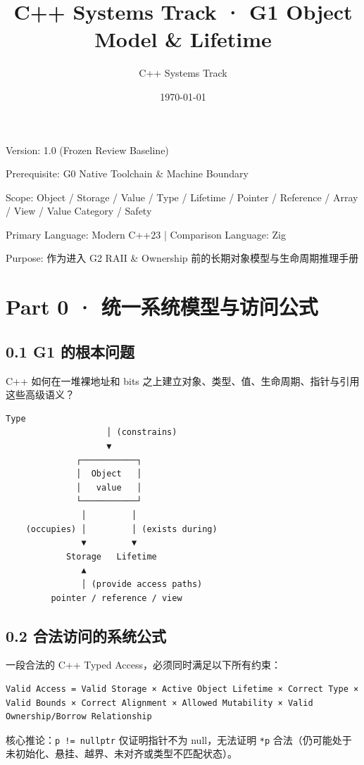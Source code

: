 \documentclass[11pt,a4paper]{article}
\title{\textbf{\Large C++ Systems Track · G1 Object Model \& Lifetime}}
\author{C++ Systems Track}
\date{\today}
\begin{document}
\maketitle
\tableofcontents
\newpage

Version: 1.0 (Frozen Review Baseline)

Prerequisite: G0 Native Toolchain \& Machine Boundary

Scope: Object / Storage / Value / Type / Lifetime / Pointer / Reference / Array / View / Value Category / Safety

Primary Language: Modern C++23 | Comparison Language: Zig

Purpose: 作为进入 G2 RAII \& Ownership 前的长期对象模型与生命周期推理手册

\section{Part 0 · 统一系统模型与访问公式}
\subsection{0.1 G1 的根本问题}
C++ 如何在一堆裸地址和 bits 之上建立对象、类型、值、生命周期、指针与引用这些高级语义？

\begin{lstlisting}[language=text]
                  Type
                    │ (constrains)
                    ▼
              ┌───────────┐
              │  Object   │
              │   value   │
              └───────────┘
               │         │
    (occupies) │         │ (exists during)
               ▼         ▼
            Storage   Lifetime
               ▲
               │ (provide access paths)
         pointer / reference / view
\end{lstlisting}
\subsection{0.2 合法访问的系统公式}
一段合法的 C++ Typed Access，必须同时满足以下所有约束：

\begin{lstlisting}[language=text]
Valid Access = Valid Storage × Active Object Lifetime × Correct Type × Valid Bounds × Correct Alignment × Allowed Mutability × Valid Ownership/Borrow Relationship
\end{lstlisting}
核心推论：\texttt{p != nullptr} 仅证明指针不为 null，无法证明 \texttt{*p} 合法（仍可能处于未初始化、悬挂、越界、未对齐或类型不匹配状态）。
\end{document}
